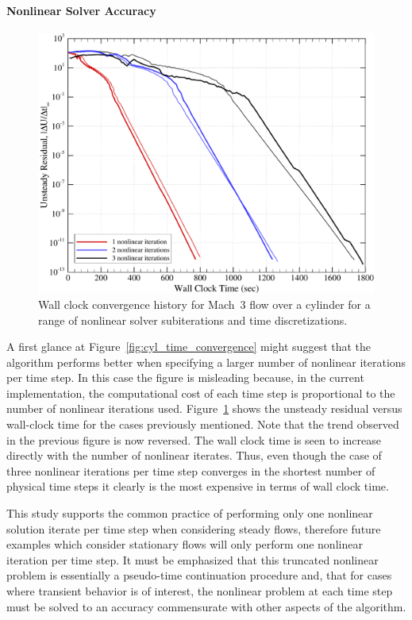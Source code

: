 \paragraph{Nonlinear Solver Accuracy}
\begin{figure}[hbtp]
  \begin{center}
    \includegraphics[width=\textwidth]{figures/mach3_cylinder/walltime_convergence}
    \caption{Wall clock convergence history for Mach~3 flow over a cylinder for a range of nonlinear solver subiterations and time discretizations.\label{fig:cyl_wallclock_convergence}}
  \end{center}  
\end{figure}
A first glance at Figure~\ref{fig:cyl_time_convergence} might suggest that the algorithm performs better when specifying a larger number of nonlinear iterations per time step. In this case the figure is misleading because, in the current implementation, the computational cost of each time step is proportional to the number of nonlinear iterations used. 
Figure~\ref{fig:cyl_wallclock_convergence} shows the unsteady residual versus wall-clock time for the cases previously mentioned.  Note that the trend observed in the previous figure is now reversed.  The wall clock time is seen to increase directly with the number of nonlinear iterates.  Thus, even though the case of three nonlinear iterations per time step converges in the shortest number of physical time steps it clearly is the most expensive in terms of wall clock time.

This study supports the common practice of performing only one nonlinear solution iterate per time step when considering steady flows, therefore future examples which consider stationary flows will only perform one nonlinear iteration per time step.  It must be emphasized that this truncated nonlinear problem is essentially a pseudo-time continuation procedure and, that for cases where transient behavior is of interest, the nonlinear problem at each time step must be solved to an accuracy commensurate with other aspects of the algorithm.

